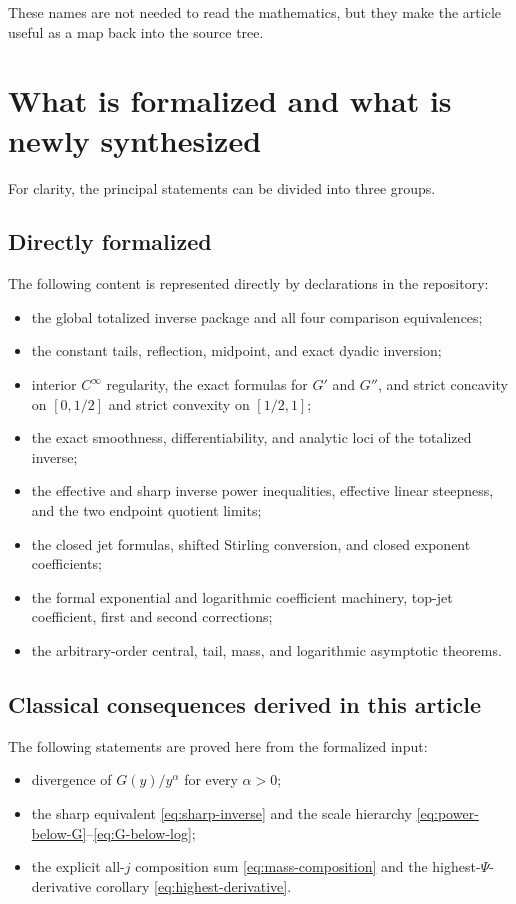 \documentclass[11pt,oneside]{article}
\theoremstyle{definition}
\theoremstyle{remark}
\newcommand{\InvF}{G}
\begin{document}
These names are not needed to read the mathematics, but they make the
article useful as a map back into the source tree.

\section{What is formalized and what is newly synthesized}
\label{sec:status-ledger}

For clarity, the principal statements can be divided into three groups.

\subsection{Directly formalized}

The following content is represented directly by declarations in the
repository:
\begin{itemize}
\item the global totalized inverse package and all four comparison
equivalences;
\item the constant tails, reflection, midpoint, and exact dyadic
inversion;
\item interior $C^\infty$ regularity, the exact formulas for $\InvF'$ and
$\InvF''$, and strict concavity on $[0,1/2]$ and strict convexity on
$[1/2,1]$;
\item the exact smoothness, differentiability, and analytic loci of the
totalized inverse;
\item the effective and sharp inverse power inequalities, effective
linear steepness, and the two endpoint quotient limits;
\item the closed jet formulas, shifted Stirling conversion, and closed
exponent coefficients;
\item the formal exponential and logarithmic coefficient machinery,
top-jet coefficient, first and second corrections;
\item the arbitrary-order central, tail, mass, and logarithmic
asymptotic theorems.
\end{itemize}

\subsection{Classical consequences derived in this article}

The following statements are proved here from the formalized input:
\begin{itemize}
\item divergence of $\InvF(y)/y^\alpha$ for every $\alpha>0$;
\item the sharp equivalent \eqref{eq:sharp-inverse} and the scale
hierarchy \eqref{eq:power-below-G}--\eqref{eq:G-below-log};
\item the explicit all-$j$ composition sum \eqref{eq:mass-composition}
and the highest-$\Psi$-derivative corollary
\eqref{eq:highest-derivative}.
\end{itemize}
\end{document}
